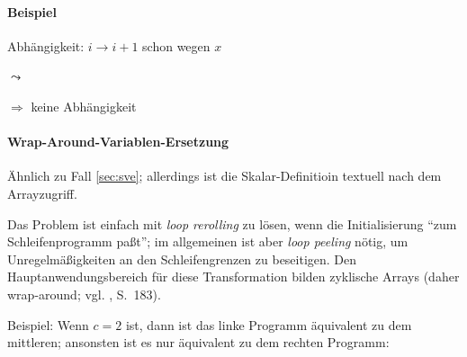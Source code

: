 \paragraph{Beispiel}

\begin{procedure}[H]
\SetAlgoLined
{}
\end{procedure}
Abhängigkeit: $i \rightarrow i+1$ schon wegen $x$

$\leadsto$

\begin{procedure}[H]
\SetAlgoLined
{}
\end{procedure}

$\Rightarrow$ keine Abhängigkeit
\newpage
\paragraph{Wrap-Around-Variablen-Ersetzung}
\label{sec:wave}

Ähnlich zu Fall \ref{sec:sve}; allerdings ist die Skalar-Definitioin
textuell nach dem Arrayzugriff.

Das Problem ist einfach mit \emph{loop rerolling} zu lösen, wenn die
Initialisierung ``zum Schleifenprogramm paßt''; im allgemeinen ist aber
\emph{loop peeling} nötig, um Unregelmäßigkeiten an den Schleifengrenzen
zu beseitigen. Den Hauptanwendungsbereich für diese Transformation
bilden zyklische Arrays (daher wrap-around; vgl. \cite{Zima90}, S.~183).

Beispiel: Wenn $c=2$ ist, dann ist das linke Programm  äquivalent zu dem
mittleren; ansonsten ist es nur äquivalent zu dem rechten Programm:\\

